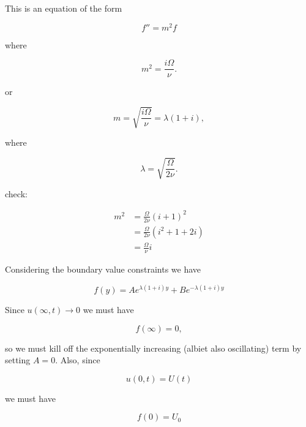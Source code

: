 This is an equation of the form

\begin{equation}\label{eqn:continuumL17:n}
f'' = m^2 f
\end{equation}

where

\begin{equation}\label{eqn:continuumL17:n}
m^2 = \frac{i \Omega}{\nu}.
\end{equation}

or

\begin{equation}\label{eqn:continuumL17:n}
m = \sqrt{\frac{i \Omega}{\nu}} = \lambda (1 + i),
\end{equation}

where

\begin{equation}\label{eqn:continuumL17:n}
\lambda = \sqrt{\frac{\Omega}{2 \nu}}.
\end{equation}

check:

\begin{align*}
m^2 
&= 
\frac{\Omega}{2 \nu} (i + 1)^2 \\
&= 
\frac{\Omega}{2 \nu} (i^2 + 1 + 2 i) \\
&= 
\frac{\Omega}{\nu} i
\end{align*}

Considering the boundary value constraints we have

\begin{equation}\label{eqn:continuumL17:n}
f(y) = 
A e^{\lambda (1 + i) y}
+ B e^{-\lambda (1 + i) y}
\end{equation}

Since $u(\infty, t) \rightarrow 0$ we must have

\begin{equation}\label{eqn:continuumL17:n}
f(\infty) = 0,
\end{equation}

so we must kill off the exponentially increasing (albiet also oscillating) term by setting $A = 0$.  Also, since

\begin{equation}\label{eqn:continuumL17:n}
u(0, t) = U(t)
\end{equation}

we must have

\begin{equation}\label{eqn:continuumL17:n}
f(0) = U_0
\end{equation}

